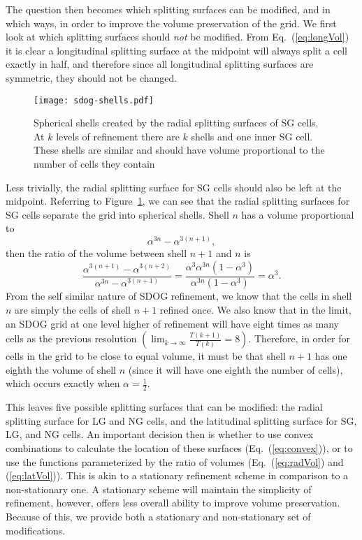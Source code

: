 The question then becomes which splitting surfaces can be modified, and in which ways, in order to improve the volume preservation of the grid.
We first look at which splitting surfaces should \textit{not} be modified.
From Eq.~(\ref{eq:longVol}) it is clear a longitudinal splitting surface at the midpoint will always split a cell exactly in half, and therefore since all longitudinal splitting surfaces are symmetric, they should not be changed.


\begin{figure}[tb]
	\texttt{[image: sdog-shells.pdf]}
	\caption[Title]{
		Spherical shells created by the radial splitting surfaces of SG cells.
		At $k$ levels of refinement there are $k$ shells and one inner SG cell.
		These shells are similar and should have volume proportional to the number of cells they contain
	}
	\label{fig:sdog-shells}
\end{figure}


Less trivially, the radial splitting surface for SG cells should also be left at the midpoint.
Referring to Figure~\ref{fig:sdog-shells}, we can see that the radial splitting surfaces for SG cells separate the grid into spherical shells.
Shell $n$ has a volume proportional to
%
\begin{equation}
\alpha^{3n} - \alpha^{3 \left( n + 1 \right)},
\end{equation}
%
then the ratio of the volume between shell $n+1$ and $n$ is
%
\begin{equation}
\frac{ \alpha^{3 \left(n + 1 \right)} - \alpha^{3\left( n + 2 \right)} }{ \alpha^{3n} - \alpha^{3 \left( n + 1 \right)} } = \frac{ \alpha^{3} \alpha^{3n} \left( 1 - \alpha^{3} \right) }{ \alpha^{3n} \left( 1 - \alpha^{3} \right) } = \alpha^{3}.
\end{equation}
%
From the self similar nature of SDOG refinement, we know that the cells in shell $n$ are simply the cells of shell $n+1$ refined once.
We also know that in the limit, an SDOG grid at one level higher of refinement will have eight times as many cells as the previous resolution $\left( \lim_{k \to \infty} \frac{ T(k+1) }{ T(k) }  = 8 \right)$.
Therefore, in order for cells in the grid to be close to equal volume, it must be that shell $n+1$ has one eighth the volume of shell $n$ (since it will have one eighth the number of cells), which occurs exactly when $\alpha = \frac{1}{2}$.


This leaves five possible splitting surfaces that can be modified: the radial splitting surface for LG and NG cells, and the latitudinal splitting surface for SG, LG, and NG cells.
An important decision then is whether to use convex combinations to calculate the location of these surfaces (Eq.~(\ref{eq:convex})), or to use the functions parameterized by the ratio of volumes (Eq.~(\ref{eq:radVol}) and (\ref{eq:latVol})).
This is akin to a stationary refinement scheme in comparison to a non-stationary one.
A stationary scheme will maintain the simplicity of refinement, however, offers less overall ability to improve volume preservation.
Because of this, we provide both a stationary and non-stationary set of modifications.


